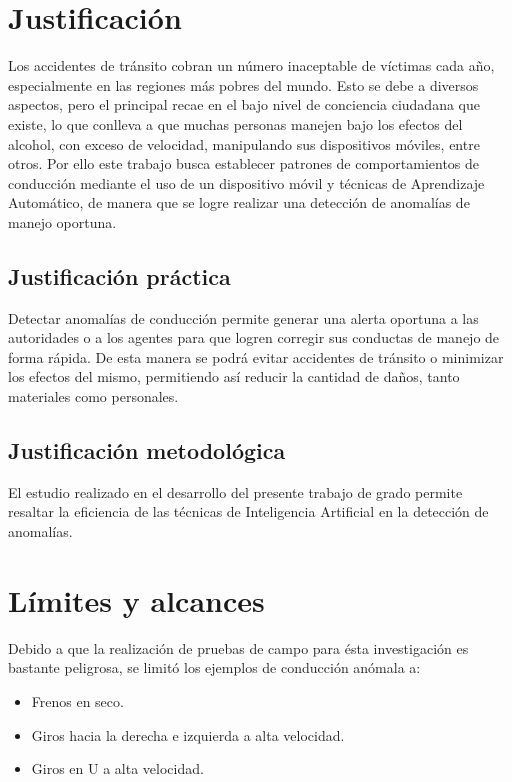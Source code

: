 
\section{Justificación}

Los accidentes de tránsito cobran un número inaceptable de víctimas cada a\~{n}o, especialmente en las regiones m\'{a}s pobres del mundo. Esto se debe a diversos aspectos, pero el principal recae en el bajo nivel de conciencia ciudadana que existe, lo que conlleva a que muchas personas manejen bajo los efectos del alcohol, con exceso de velocidad, manipulando sus dispositivos m\'{o}viles, entre otros. Por ello este trabajo busca establecer patrones de comportamientos de conducci\'{o}n mediante el uso de un dispositivo m\'{o}vil y t\'{e}cnicas de Aprendizaje Autom\'{a}tico, de manera que se logre realizar una detecci\'{o}n de anomal\'{i}as de manejo oportuna.

\subsection{Justificaci\'{o}n pr\'{a}ctica}

Detectar anomal\'{i}as de conducci\'{o}n permite generar una alerta oportuna a las autoridades o a los agentes para que logren corregir sus conductas de manejo de forma r\'{a}pida. De esta manera se podr\'{a} evitar accidentes de tr\'{a}nsito o minimizar los efectos del mismo, permitiendo as\'{i} reducir la cantidad de da\~{n}os, tanto materiales como personales.

\subsection{Justificaci\'{o}n metodol\'{o}gica}

El estudio realizado en el desarrollo del presente trabajo de grado permite resaltar la eficiencia de las t\'{e}cnicas de Inteligencia Artificial en la detecci\'{o}n de anomal\'{i}as.

\section{L\'{i}mites y alcances}

Debido a que la realizaci\'{o}n de pruebas de campo para \'{e}sta investigaci\'{o}n es bastante peligrosa, se limit\'{o} los ejemplos de conducci\'{o}n an\'{o}mala a:

\begin{itemize}
\item Frenos en seco.
\item Giros hacia la derecha e izquierda a alta velocidad.
\item Giros en U a alta velocidad.
\end{itemize}

